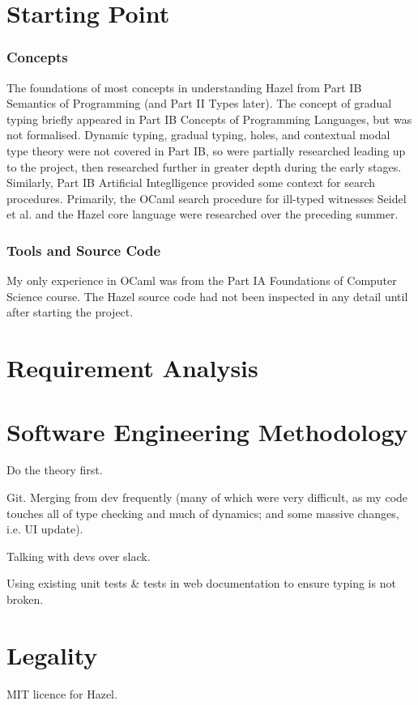 \section{Starting Point}\label{sec:StartingPoint}
\subsubsection{Concepts}
The foundations of most concepts in understanding Hazel from Part IB Semantics of Programming (and Part II Types later). The concept of gradual typing briefly appeared in Part IB Concepts of Programming Languages, but was not formalised. Dynamic typing, gradual typing, holes, and contextual modal type theory were not covered in Part IB, so were partially researched leading up to the project, then researched further in greater depth during the early stages. Similarly, Part IB Artificial Integlligence provided some context for search procedures. Primarily, the OCaml search procedure for ill-typed witnesses Seidel et al. \cite{SearchProc} and the Hazel core language \cite{HazelLivePaper} were researched over the preceding summer.

\subsubsection{Tools and Source Code}
My only experience in OCaml was from the Part IA Foundations of Computer Science course. The Hazel source code had not been inspected in any detail until after starting the project.

\section{Requirement Analysis}\label{sec:RequirementAnalysis}

\section{Software Engineering Methodology}\label{sec:EngineeringMethodology}
Do the theory first. 

Git. Merging from dev frequently (many of which were very difficult, as my code touches all of type checking and much of dynamics; and some massive changes, i.e. UI update). 

Talking with devs over slack.

Using existing unit tests \& tests in web documentation to ensure typing is not broken.

\section{Legality}\label{sec:Legality}
MIT licence for Hazel.
